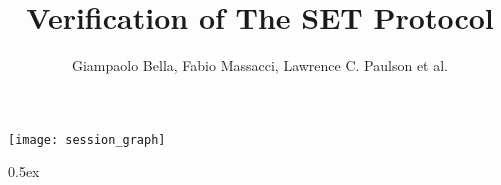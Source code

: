 \documentclass[10pt,a4paper,twoside]{article}
\begin{document}
\pagestyle{headings}

\title{Verification of The SET Protocol}
\author{Giampaolo Bella, Fabio Massacci, Lawrence C. Paulson et al.}
\maketitle

\tableofcontents

\begin{center}
  \texttt{[image: session\_graph]}  
\end{center}

\newpage

\parindent 0pt\parskip 0.5ex


\end{document}
